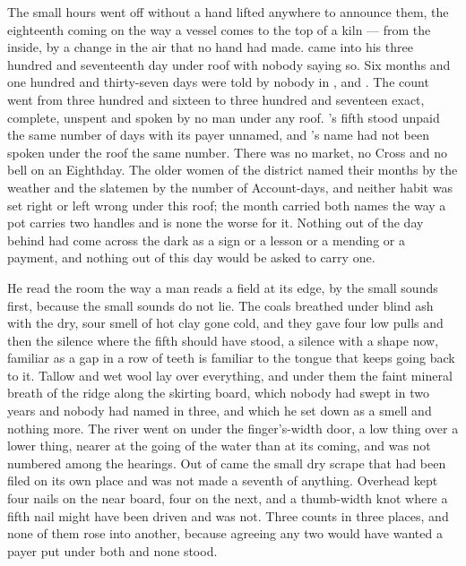 
The small hours went off without a hand lifted anywhere to announce them, the eighteenth coming on the way a vessel comes to the top of a kiln --- from the inside, by a change in the air that no hand had made.  came into his three hundred and seventeenth day under  roof with nobody saying so. Six months and one hundred and thirty-seven days were told by nobody in ,  and . The count went from three hundred and sixteen to three hundred and seventeen exact, complete, unspent and spoken by no man under any roof. 's fifth stood unpaid the same number of days with its payer unnamed, and 's name had not been spoken under the roof the same number. There was no market, no Cross and no bell on an Eighthday. The older women of the district named their months by the weather and the slatemen by the number of Account-days, and neither habit was set right or left wrong under this roof; the month carried both names the way a pot carries two handles and is none the worse for it. Nothing out of the day behind had come across the dark as a sign or a lesson or a mending or a payment, and nothing out of this day would be asked to carry one.

He read the room the way a man reads a field at its edge, by the small sounds first, because the small sounds do not lie. The coals breathed under blind ash with the dry, sour smell of hot clay gone cold, and they gave four low pulls and then the silence where the fifth should have stood, a silence with a shape now, familiar as a gap in a row of teeth is familiar to the tongue that keeps going back to it. Tallow and wet wool lay over everything, and under them the faint mineral breath of the  ridge along the skirting board, which nobody had swept in two years and nobody had named in three, and which he set down as a smell and nothing more. The river went on  under the finger's-width door, a low thing over a lower thing, nearer at the going of the water than at its coming, and was not numbered among the hearings. Out of  came the small dry scrape that had been filed on its own place and was not made a seventh of anything. Overhead  kept four nails on the near board, four on the next, and a thumb-width knot where a fifth nail might have been driven and was not. Three counts in three places, and none of them rose into another, because agreeing any two would have wanted a payer put under both and none stood.

